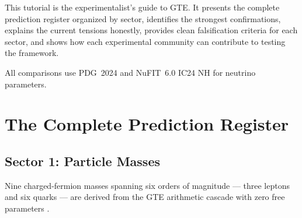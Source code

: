 \documentclass[11pt,a4paper]{article}
\begin{document}
This tutorial is the experimentalist's guide to GTE.  It presents the complete
prediction register organized by sector, identifies the strongest confirmations,
explains the current tensions honestly, provides clean falsification criteria for
each sector, and shows how each experimental community can contribute to testing
the framework.

All comparisons use PDG~2024 \cite{SpivackSM} and NuFIT~6.0 IC24 NH
\cite{SpivackGTECompleteFramework} for neutrino parameters.

\section{The Complete Prediction Register}
\label{sec:register}

\subsection{Sector 1: Particle Masses}

Nine charged-fermion masses spanning six orders of magnitude — three leptons and
six quarks — are derived from the GTE arithmetic cascade with zero free
parameters \cite{SpivackSM, SpivackGTECompleteFramework}.
\end{document}
